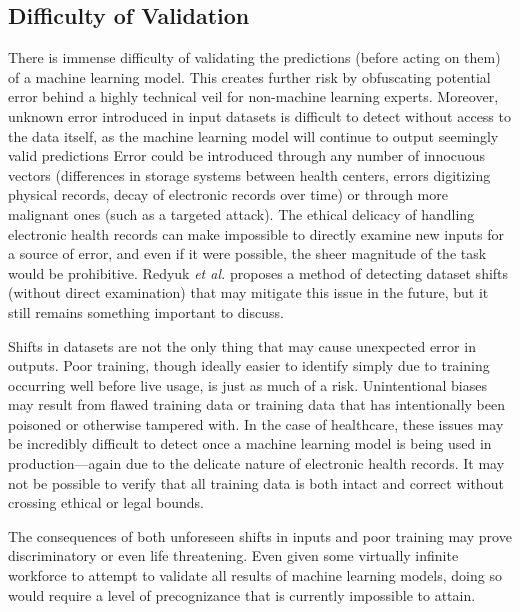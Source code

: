 \documentclass[]{article}
\begin{document}
		\subsection{Difficulty of Validation}
			There is immense difficulty of validating the predictions (before acting on them) of a machine learning model. This creates further risk by obfuscating potential error behind a highly technical veil for non-machine learning experts. Moreover, unknown error introduced in input datasets is difficult to detect without access to the data itself, as the machine learning model will continue to output seemingly valid predictions\cite{10.1145/3328519.3329126} Error could be introduced through any number of innocuous vectors (differences in storage systems between health centers, errors digitizing physical records, decay of electronic records over time) or through more malignant ones (such as a targeted attack). The ethical delicacy of handling electronic health records\cite{ford2016privacy} can make impossible to directly examine new inputs for a source of error, and even if it were possible, the sheer magnitude of the task would be prohibitive. Redyuk \emph{et al.} proposes a method of detecting dataset shifts (without direct examination) that may mitigate this issue in the future\cite{10.1145/3328519.3329126}, but it still remains something important to discuss.

			Shifts in datasets are not the only thing that may cause unexpected error in outputs. Poor training, though ideally easier to identify simply due to training occurring well before live usage, is just as much of a risk. Unintentional biases may result from flawed training data\cite{7912315} or training data that has intentionally been poisoned or otherwise tampered with\cite{6868201}. In the case of healthcare, these issues may be incredibly difficult to detect once a machine learning model is being used in production---again due to the delicate nature of electronic health records. It may not be possible to verify that all training data is both intact and correct without crossing ethical or legal bounds.
			
			The consequences of both unforeseen shifts in inputs and poor training may prove discriminatory or even life threatening. Even given some virtually infinite workforce to attempt to validate all results of machine learning models, doing so would require a level of precognizance that is currently impossible to attain.
\end{document}
